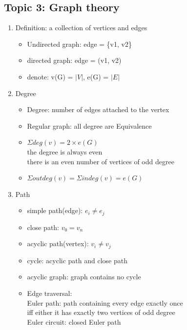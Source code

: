 \documentclass[11pt, a4paper]{article}
\begin{document}
\begin{multicols}{3}
\section*{Topic 3: Graph theory}
    \begin{enumerate}
        \item Definition: a collection of vertices and edges
            \begin{itemize}
                \item Undirected graph: edge = \{v1, v2\}
                \item directed graph: edge = (v1, v2)
                \item denote: v(G) = $|V|$, e(G) = $|E|$
            \end{itemize}
        \item Degree
            \begin{itemize}
                \item Degree: number of edges attached to the vertex
                \item Regular graph: all degree are Equivalence
                \item $\Sigma deg(v) = 2 \times e(G)$\\
                    the degree is always even\\
                    there is an even number of vertices of odd degree
                \item $\Sigma outdeg(v) = \Sigma indeg(v) = e(G)$
            \end{itemize}
        \item Path
            \begin{itemize}
                \item simple path(edge): $e_i \neq e_j$
                \item close path: $v_0 = v_n$
                \item acyclic path(vertex): $v_i \neq v_j$
                \item cycle: acyclic path and close path
                \item acyclic graph: graph contains no cycle
                \item Edge traversal:\\
                    Euler path: path containing every edge exactly once\\
                    iff either it has exactly two vertices of odd degree\\
                    Euler circuit: closed Euler path\\

\end{itemize}
\end{enumerate}
\end{multicols}
\end{document}
